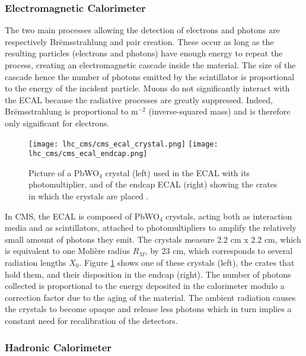             \subsubsection{Electromagnetic Calorimeter}

                The two main processes allowing the detection of electrons and photons are respectively Brëmsstrahlung and pair creation. These occur as long as the resulting particles (electrons and photons) have enough energy to repeat the process, creating an electromagnetic cascade inside the material. The size of the cascade hence the number of photons emitted by the scintillator is proportional to the energy of the incident particle. Muons do not significantly interact with the ECAL because the radiative processes are greatly suppressed. Indeed, Brëmsstrahlung is proportional to m$ ^{-2} $ (inverse-squared mass) and is therefore only significant for electrons. \\

                \begin{figure}[h!]
                    \centering
                    \texttt{[image: lhc\_cms/cms\_ecal\_crystal.png]}
                    \texttt{[image: lhc\_cms/cms\_ecal\_endcap.png]}
                    \caption{Picture of a PbWO$ _4 $ crystal (left) used in the ECAL with its photomultiplier, and of the endcap ECAL (right) showing the crates in which the crystals are placed \Cite{CMS_at_LHC}.}
                    \label{fig:lhc_and_cms__cms_ecal_view}
                \end{figure}

                In CMS, the ECAL is composed of PbWO$ _4 $ crystals, acting both as interaction media and as scintillators, attached to photomultipliers to amplify the relatively small amount of photons they emit. The crystals measure 2.2 cm x 2.2 cm, which is equivalent to one Molière radius $ R_M $, by 23 cm, which corresponds to several radiation lengths $ X_0 $. Figure \ref{fig:lhc_and_cms__cms_ecal_view} shows one of these crystals (left), the crates that hold them, and their disposition in the endcap (right). The number of photons collected is proportional to the energy deposited in the calorimeter modulo a correction factor due to the aging of the material. The ambient radiation causes the crystals to become opaque and release less photons which in turn implies a constant need for recalibration of the detectors.

            \subsubsection{Hadronic Calorimeter}

